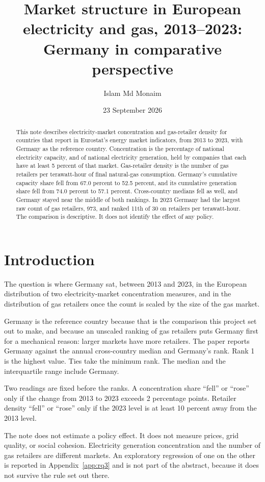 \documentclass[11pt,a4paper]{article}
\title{Market structure in European electricity and gas, 2013--2023:\\ Germany in comparative perspective}
\author{Islam Md Monaim}
\date{23 September 2026}
\begin{document}
\maketitle

\begin{abstract}
\noindent
This note describes electricity-market concentration and gas-retailer density for countries that report in Eurostat's energy market indicators, from 2013 to 2023, with Germany as the reference country. Concentration is the percentage of national electricity capacity, and of national electricity generation, held by companies that each have at least 5 percent of that market. Gas-retailer density is the number of gas retailers per terawatt-hour of final natural-gas consumption. Germany's cumulative capacity share fell from 67.0 percent to 52.5 percent, and its cumulative generation share fell from 74.0 percent to 57.1 percent. Cross-country medians fell as well, and Germany stayed near the middle of both rankings. In 2023 Germany had the largest raw count of gas retailers, 973, and ranked 11th of 30 on retailers per terawatt-hour. The comparison is descriptive. It does not identify the effect of any policy.
\end{abstract}

\section{Introduction}

The question is where Germany sat, between 2013 and 2023, in the European distribution of two electricity-market concentration measures, and in the distribution of gas retailers once the count is scaled by the size of the gas market.

Germany is the reference country because that is the comparison this project set out to make, and because an unscaled ranking of gas retailers puts Germany first for a mechanical reason: larger markets have more retailers. The paper reports Germany against the annual cross-country median and Germany's rank. Rank 1 is the highest value. Ties take the minimum rank. The median and the interquartile range include Germany.

Two readings are fixed before the ranks. A concentration share ``fell'' or ``rose'' only if the change from 2013 to 2023 exceeds 2 percentage points. Retailer density ``fell'' or ``rose'' only if the 2023 level is at least 10 percent away from the 2013 level.

The note does not estimate a policy effect. It does not measure prices, grid quality, or social cohesion. Electricity generation concentration and the number of gas retailers are different markets. An exploratory regression of one on the other is reported in Appendix~\ref{app:rq3} and is not part of the abstract, because it does not survive the rule set out there.
\end{document}
